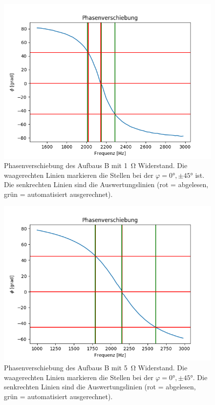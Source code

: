 \documentclass[12pt,a4paper]{article}
\begin{document}
\begin{figure}
	\centering
	\includegraphics[scale=0.8]{Bilder/Serie_Phasenverschiebung_B_1.png}
	\caption{Phasenverschiebung des Aufbaus B mit \SI{1}{\ohm} Widerstand. Die waagerechten Linien markieren die Stellen bei der $\varphi = \ang{0}, \pm \ang{45}$ ist. Die senkrechten Linien sind die Auswertungslinien (rot = abgelesen, grün = automatisiert ausgerechnet).}
	\label{fig:Serie_Phasenverschiebung_B_1}
\end{figure}
\begin{figure}
	\centering
	\includegraphics[scale=0.8]{Bilder/Serie_Phasenverschiebung_B_5.png}
	\caption{Phasenverschiebung des Aufbaus B mit \SI{5}{\ohm} Widerstand. Die waagerechten Linien markieren die Stellen bei der $\varphi = \ang{0}, \pm \ang{45}$. Die senkrechten Linien sind die Auswertungslinien (rot = abgelesen, grün = automatisiert ausgerechnet).}
	\label{fig:Serie_Phasenverschiebung_B_5}
\end{figure}
\end{document}
